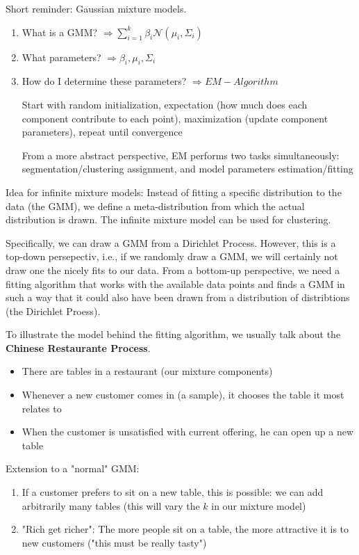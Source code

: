 \documentclass{scrartcl}
\begin{document}
Short reminder: Gaussian mixture models.
\begin{enumerate}
    \item
        What is a GMM? \(\Rightarrow \sum_{i=1}^k \beta_i \mathcal{N}(\mu_i, \Sigma_i)\)
    \item
        What parameters? \(\Rightarrow \beta_i, \mu_i, \Sigma_i\) 
    \item
        How do I determine these parameters? \(\Rightarrow EM-Algorithm\)

        Start with random initialization, expectation (how much does each component contribute to each point), maximization (update component parameters), repeat until convergence

        From a more abstract perspective, EM performs two tasks simultaneously: segmentation/clustering assignment, and model parameters estimation/fitting
\end{enumerate}

\bigbreak

Idea for infinite mixture models: Instead of fitting a specific distribution to the data (the GMM), we define a meta-distribution from which the actual distribution is drawn. The infinite mixture model can be used for clustering.

Specifically, we can draw a GMM from a Dirichlet Process. However, this is a top-down persepectiv, i.e., if we randomly draw a GMM, we will certainly not draw one the nicely fits to our data. From a bottom-up perspective, we need a fitting algorithm that works with the available data points and finds a GMM in such a way that it could also have been drawn from a distribution of distribtions (the Dirichlet Proess).

To illustrate the model behind the fitting algorithm, we usually talk about the \textbf{Chinese Restaurante Process}.

\begin{itemize}
    \item
        There are tables in a restaurant (our mixture components)
    \item
        Whenever a new customer comes in (a sample), it chooses the table it most relates to
    \item
        When the customer is unsatisfied with current offering, he can open up a new table
\end{itemize}

Extension to a "normal" GMM:
\begin{enumerate}
    \item
        If a customer prefers to sit on a new table, this is possible: we can add arbitrarily many tables (this will vary the \(k\) in our mixture model)
    \item
        "Rich get richer":
        The more people sit on a table, the more attractive it is to new customers ("this must be really tasty")
\end{enumerate}
\end{document}
